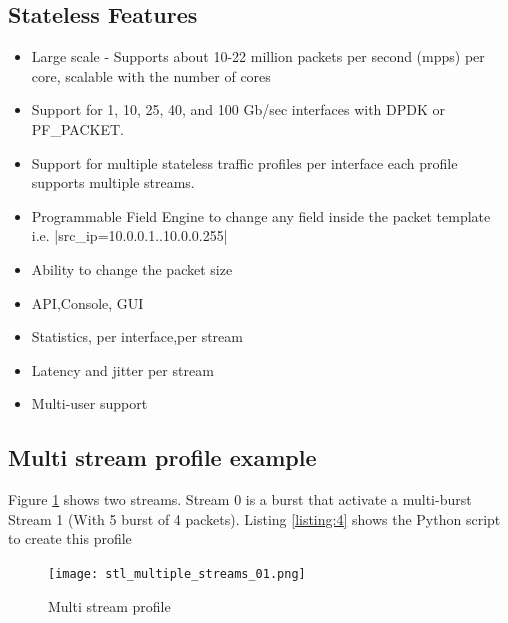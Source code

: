 \documentclass[letterpaper]{article}
\begin{document}
\subsection{Stateless Features}

\begin{itemize}
\item Large scale - Supports about 10-22 million packets per second (mpps) per core, scalable with the number of cores
\item Support for 1, 10, 25, 40, and 100 Gb/sec interfaces with DPDK or PF\_PACKET.
\item Support for multiple stateless traffic profiles per interface each profile supports multiple streams. 
\item Programmable Field Engine to change any field inside the packet template i.e. |src_ip=10.0.0.1..10.0.0.255| 
\item Ability to change the packet size 
\item API,Console, GUI
\item Statistics, per interface,per stream 
\item Latency and jitter per stream
\item Multi-user support 
\end{itemize}

\subsection{Multi stream profile example}


Figure \ref{fig:stlmulti} shows two streams. Stream 0 is a burst that activate a multi-burst Stream 1 (With 5 burst of 4 packets). 
Listing \ref{listing:4} shows the Python script to create this profile 

\begin{figure}[h]
\texttt{[image: stl\_multiple\_streams\_01.png]}
\caption{Multi stream profile}
\label{fig:stlmulti}
\end{figure}
\end{document}
